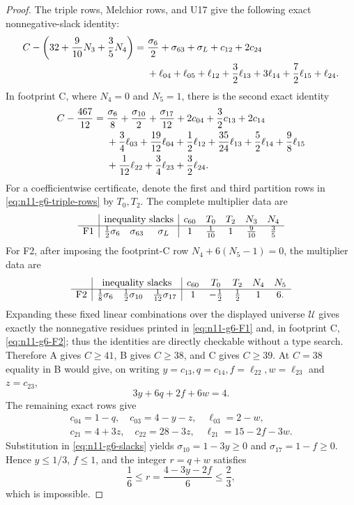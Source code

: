 \begin{proof}
The triple rows, Melchior rows, and U17 give the following exact
nonnegative-slack identity:
\begin{align}
C-\left(32+\frac9{10}N_3+\frac35N_4\right)
={}&\frac{\sigma_6}{2}+\sigma_{63}+\sigma_L+c_{12}+2c_{24}\notag\\
&+\ell_{04}+\ell_{05}+\ell_{12}+\frac32\ell_{13}
+3\ell_{14}+\frac72\ell_{15}+\ell_{24}.\label{eq:n11-g6-F1}
\end{align}
In footprint C, where $N_4=0$ and $N_5=1$, there is the second exact
identity
\begin{align}
C-\frac{467}{12}
={}&\frac{\sigma_6}{8}+\frac{\sigma_{10}}2
+\frac{\sigma_{17}}{12}+2c_{04}+\frac32c_{13}+2c_{14}\notag\\
&+\frac34\ell_{03}+\frac{19}{12}\ell_{04}
+\frac12\ell_{12}+\frac{35}{24}\ell_{13}
+\frac52\ell_{14}+\frac98\ell_{15}\notag\\
&+\frac1{12}\ell_{22}+\frac34\ell_{23}
+\frac32\ell_{24}.\label{eq:n11-g6-F2}
\end{align}
For a coefficientwise certificate, denote the first and third partition
rows in \eqref{eq:n11-g6-triple-rows} by $T_0,T_2$.  The complete multiplier
data are
\[
\begin{array}{c|ccc|ccccc}
&\multicolumn{3}{c|}{\text{inequality slacks}}
 &c_{60}&T_0&T_2&N_3&N_4\\ \hline
\mathrm{F1}&\frac12\sigma_6&\sigma_{63}&\sigma_L
 &1&\frac1{10}&1&\frac9{10}&\frac35
\end{array}
\]
For F2, after imposing the footprint-C row
$N_4+6(N_5-1)=0$, the multiplier data are
\[
\begin{array}{c|ccc|ccccc}
&\multicolumn{3}{c|}{\text{inequality slacks}}
 &c_{60}&T_0&T_2&N_4&N_5\\ \hline
\mathrm{F2}&\frac18\sigma_6&\frac12\sigma_{10}&\frac1{12}\sigma_{17}
 &1&-\frac12&\frac12&1&6.
\end{array}
\]
Expanding these fixed linear combinations over the displayed universe
$\mathcal U$ gives exactly the nonnegative residues printed in
\eqref{eq:n11-g6-F1} and, in footprint C, \eqref{eq:n11-g6-F2}; thus the
identities are directly
checkable without a type search.  Therefore A gives $C\ge41$, B gives
$C\ge38$, and C gives
$C\ge39$.  At $C=38$ equality in B would give, on writing
$y=c_{13},q=c_{14},f=\ell_{22},w=\ell_{23}$ and $z=c_{23}$,
\[
 3y+6q+2f+6w=4.
\]
The remaining exact rows give
\[
\begin{gathered}
 c_{04}=1-q,\quad c_{03}=4-y-z,\quad \ell_{03}=2-w,\\
 c_{21}=4+3z,\quad c_{22}=28-3z,\quad
 \ell_{21}=15-2f-3w.
\end{gathered}
\]
Substitution in \eqref{eq:n11-g6-slacks} yields
$\sigma_{10}=1-3y\ge0$ and $\sigma_{17}=1-f\ge0$.  Hence
$y\le1/3$, $f\le1$, and the integer $r=q+w$ satisfies
\[
 \frac16\le r=\frac{4-3y-2f}{6}\le\frac23,
\]
which is impossible.


\end{proof}
